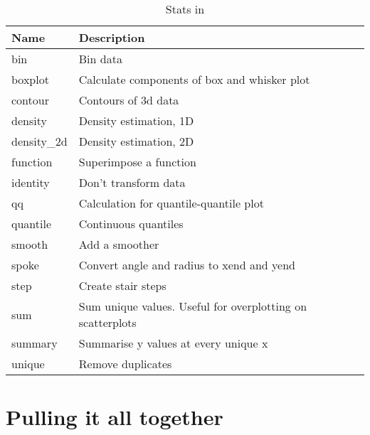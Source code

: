 \begin{table}
  \begin{center}
  \begin{tabular}{lp{3in}}
    \toprule
    Name & Description \\
    \midrule
    bin          & Bin data                                                   \\
    boxplot      & Calculate components of box and whisker plot               \\
    contour      & Contours of 3d data                                        \\
    density      & Density estimation, 1D                                     \\
    density\_2d & Density estimation, 2D                                     \\
    function     & Superimpose a function                                     \\
    identity     & Don't transform data                                       \\
    qq           & Calculation for quantile-quantile plot                     \\
    quantile     & Continuous quantiles                                       \\
    smooth       & Add a smoother                                             \\
    spoke        & Convert angle and radius to xend and yend                  \\
    step         & Create stair steps                                         \\
    sum          & Sum unique values.  Useful for overplotting on scatterplots\\
    summary      & Summarise y values at every unique x                       \\
    unique       & Remove duplicates                                          \\
    \bottomrule
  \end{tabular}
  \end{center}
  \caption{Stats in \ggplot}
  \label{tbl:stats}
\end{table}


\section{Pulling it all together}
\label{sec:pull-together}

